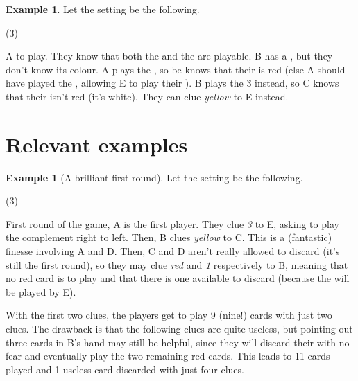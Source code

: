 \documentclass[a4paper]{article}
\theoremstyle{plain}
\theoremstyle{definition}
\newtheorem{example}[theorem]{Example}
\begin{document}
\begin{example}
	
	Let the setting be the following.
	
	\begin{tasks}(3)
		\task[+]      
		\task[A]    
		\task[B]    
		\task[C]    
		\task[D]    
		\task[E]    
	\end{tasks}
	
	A to play. They know that both the  and the  are playable. B has a , but they don't know its colour. A plays the , so be knows that their  is red (else A should have played the , allowing E to play their ). B plays the \G{3} instead, so C knows that their  isn't red (it's white). They can clue \textit{yellow} to E instead.
\end{example}

\section{Relevant examples}

\begin{example}[A brilliant first round]
	
	Let the setting be the following.
	
	\begin{tasks}(3)
		\task[+]      
		\task[A]    
		\task[B]    
		\task[C]    
		\task[D]    
		\task[E]    
	\end{tasks}
	
	First round of the game, A is the first player. They clue \textit{3} to E, asking to play the complement right to left. Then, B clues \textit{yellow} to C. This is a (fantastic) finesse involving A and D. Then, C and D aren't really allowed to discard (it's still the first round), so they may clue \textit{red} and \textit{1} respectively to B, meaning that no red card is to play and that there is one available to discard (because the  will be played by E).
	
	With the first two clues, the players get to play 9 (nine!) cards with just two clues. The drawback is that the following clues are quite useless, but pointing out three cards in B's hand may still be helpful, since they will discard their  with no fear and eventually play the two remaining red cards. This leads to 11 cards played and 1 useless card discarded with just four clues.
	
\end{example}
\end{document}
